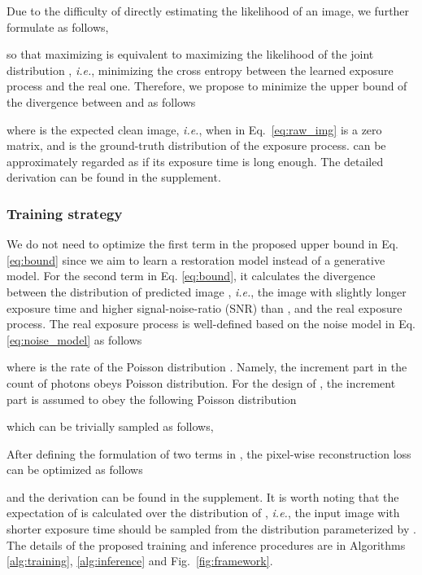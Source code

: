 \documentclass[10pt,twocolumn,letterpaper]{article}
\def\ie{\textit{i.e.}}
\begin{document}
Due to the difficulty of directly estimating the likelihood of an image, we further formulate  as follows,

so that maximizing  is equivalent to maximizing the likelihood of the joint distribution , \ie, minimizing the cross entropy between the learned exposure process and the real one. Therefore, we propose to minimize the upper bound of the divergence between  and  as follows

where  is the expected clean image, \ie, when  in Eq.~\ref{eq:raw_img} is a zero matrix, and  is the ground-truth distribution of the exposure process.  can be approximately regarded as  if its exposure time is long enough. The detailed derivation can be found in the supplement. 
\subsubsection{Training strategy}
We do not need to optimize the first term in the proposed upper bound in Eq. \ref{eq:bound} since we aim to learn a restoration model instead of a generative model.
For the second term in Eq. \ref{eq:bound}, it calculates the divergence between the distribution of predicted image , \ie, the image with slightly longer exposure time and higher signal-noise-ratio (SNR) than , and the real exposure process. The real exposure process  is well-defined based on the noise model in Eq. \ref{eq:noise_model} as follows

where  is the rate of the Poisson distribution . Namely, the increment part in the count of photons obeys Poisson distribution. For the design of , the increment part is assumed to obey the following Poisson distribution

which can be trivially sampled as follows,

After defining the formulation of two terms in , the pixel-wise reconstruction loss can be optimized as follows

and the derivation can be found in the supplement. It is worth noting that the expectation of  is calculated over the distribution of , \ie, the input image with shorter exposure time should be sampled from the distribution parameterized by . The details of the proposed training and inference procedures are in Algorithms \ref{alg:training}, \ref{alg:inference} and Fig.~\ref{fig:framework}.
\end{document}
